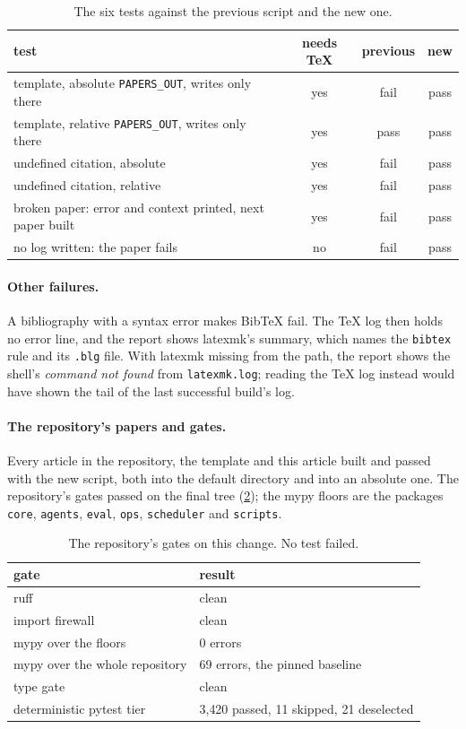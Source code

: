 \documentclass[11pt]{article}
\theoremstyle{plain}
\theoremstyle{definition}
\newcommand{\code}[1]{\texttt{#1}}
\begin{document}
\begin{table}[htbp]
\centering
\caption{The six tests against the previous script and the new one.}\label{tab:tests}
\begin{tabular}{@{}lccc@{}}
\toprule
test & needs TeX & previous & new \\
\midrule
template, absolute \code{PAPERS\_OUT}, writes only there & yes & fail & pass \\
template, relative \code{PAPERS\_OUT}, writes only there & yes & pass & pass \\
undefined citation, absolute & yes & fail & pass \\
undefined citation, relative & yes & fail & pass \\
broken paper: error and context printed, next paper built & yes & fail & pass \\
no log written: the paper fails & no & fail & pass \\
\bottomrule
\end{tabular}
\end{table}

\paragraph{Other failures.} A bibliography with a syntax error makes BibTeX fail. The TeX log
then holds no error line, and the report shows latexmk's summary, which names the \code{bibtex}
rule and its \code{.blg} file. With latexmk missing from the path, the report shows the shell's
\emph{command not found} from \code{latexmk.log}; reading the TeX log instead would have shown the
tail of the last successful build's log.

\paragraph{The repository's papers and gates.} Every article in the repository, the template and
this article built and passed with the new script, both into the default directory and into an
absolute one. The repository's gates passed on the final tree (\cref{tab:gates}); the mypy floors
are the packages \code{core}, \code{agents}, \code{eval}, \code{ops}, \code{scheduler} and
\code{scripts}.

\begin{table}[htbp]
\centering
\caption{The repository's gates on this change. No test failed.}\label{tab:gates}
\begin{tabular}{@{}ll@{}}
\toprule
gate & result \\
\midrule
ruff & clean \\
import firewall & clean \\
mypy over the floors & 0 errors \\
mypy over the whole repository & 69 errors, the pinned baseline \\
type gate & clean \\
deterministic pytest tier & 3{,}420 passed, 11 skipped, 21 deselected \\
\bottomrule
\end{tabular}
\end{table}
\end{document}
